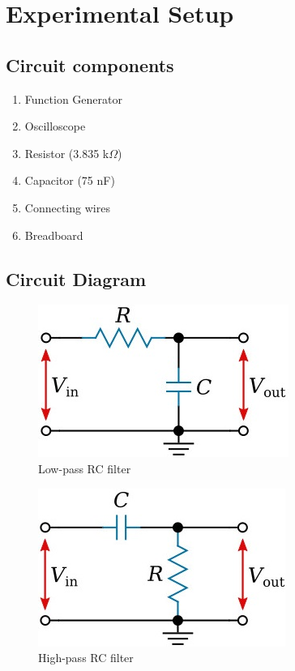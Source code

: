 \section{Experimental Setup}

\subsection*{Circuit components}
    \begin{enumerate}
        \item Function Generator
        \item Oscilloscope
        \item Resistor (3.835 k$\Omega$)
        \item Capacitor (75 nF)
        \item Connecting wires
        \item Breadboard
    \end{enumerate}

    \subsection*{Circuit Diagram}

    \begin{figure}[H]
        \centering
        \includegraphics[width=0.8\columnwidth]{images/f2.jpg}
        \caption{Low-pass RC filter}
        \label{fig:5}
    \end{figure}

    \begin{figure}[H]
        \centering
        \includegraphics[width=0.8\columnwidth]{images/f1.jpg}
        \caption{High-pass RC filter}
        \label{fig:56}
    \end{figure}

